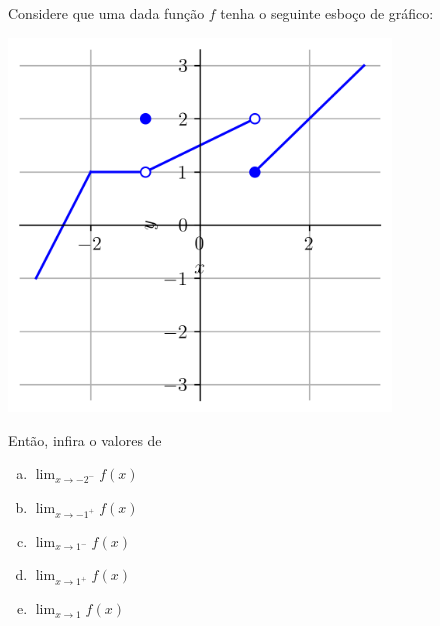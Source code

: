 \begin{exeresol}
  Considere que uma dada função $f$ tenha o seguinte esboço de gráfico:

  \begin{center}
    \includegraphics[width=4in]{./cap_lim/dados/fig_exeresol_nocaolim/fig.png}
  \end{center}

  Então, infira o valores de
  \begin{enumerate}[a)]
  \item $\displaystyle \lim_{x\to -2^-} f(x)$
  \item $\displaystyle \lim_{x\to -1^+} f(x)$
  \item $\displaystyle \lim_{x\to 1^-} f(x)$
  \item $\displaystyle \lim_{x\to 1^+} f(x)$
  \item $\displaystyle \lim_{x\to 1} f(x)$
  \end{enumerate}
\end{exeresol}
